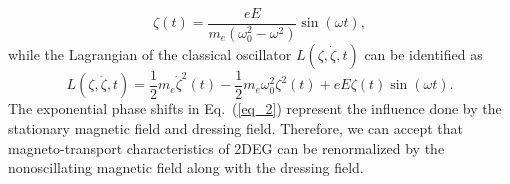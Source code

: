 \begin{equation} \label{eq_4}
  \zeta(t) = \frac{eE}{m_e(\omega_0^2 - \omega^2)}\sin(\omega t),
\end{equation}
while the Lagrangian of the classical oscillator $L(\zeta,\dot{\zeta},t)$ can be identified as
\begin{equation} \label{eq_5}
  L(\zeta,\dot{\zeta},t) = \frac{1}{2} m_e\dot{\zeta}^2(t) - \frac{1}{2}m_e\omega_0^2 \zeta^2(t) + eE\zeta(t) \sin(\omega t).
\end{equation}
The exponential phase shifts in Eq.~(\ref{eq_2}) represent the influence done by the stationary magnetic field and dressing field. Therefore, we can accept that magneto-transport characteristics of 2DEG can be renormalized by the nonoscillating magnetic field along with the dressing field.
